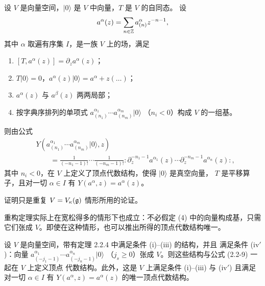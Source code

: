 \renewcommand{\thetheorem}{2.2.4}
\begin{theorem}[弱重构]
    设 $V$ 是向量空间，$|0\rangle$ 是 $V$ 中向量，$T$ 是 $V$ 的自同态。
    设
    \[
        a^\alpha(z)=\sum_{n\in\mathbb{Z}}a^\alpha_{(n)}z^{-n-1},
    \]
    其中 $\alpha$ 取遍有序集 $I$，是一族 $V$ 上的场，满足
    \begin{enumerate}[label=(\arabic*)]
        \item $[T,a^\alpha(z)]=\partial_za^\alpha(z)$；
        \item $T|0\rangle=0$，$a^\alpha(z)|0\rangle=a^\alpha+z(\dots)$；
        \item $a^\alpha(z)$ 与 $a^\beta(z)$ 两两局部；
        \item 按字典序排列的单项式
        $a^{\alpha_1}_{(n_1)}\cdots a^{\alpha_m}_{(n_m)}|0\rangle$
        （$n_i<0$）构成 $V$ 的一组基。
    \end{enumerate}
    则由公式
    \begin{equation}
        \begin{aligned}
            &Y(a^{\alpha_1}_{(n_1)}\cdots a^{\alpha_m}_{(n_m)}|0\rangle,z)\\
            &\qquad=\frac{1}{(-n_1-1)!}\cdots\frac{1}{(-n_m-1)!}
            :\!\partial_z^{-n_1-1}a^{\alpha_1}(z)\cdots
            \partial_z^{-n_m-1}a^{\alpha_n}(z)\!:,
        \end{aligned}
        \tag{2.2-9}
    \end{equation}
    其中 $n_i<0$，在 $V$ 上定义了顶点代数结构，使得 $|0\rangle$ 是真空向量，
    $T$ 是平移算子，且对一切 $\alpha\in I$ 有 $Y(a^\alpha,z)=a^\alpha(z)$。
\end{theorem}

证明只是重复 $V=V_\kappa(\mathfrak{g})$ 情形所用的论证。

重构定理实际上在宽松得多的情形下也成立：不必假定 (4) 中的向量构成基，只需
它们张成 $V$。即使在这种情形，也可以推出所得的顶点代数结构唯一。

\renewcommand{\thetheorem}{2.2.5}
\begin{theorem}[强重构]
    设 $V$ 是向量空间，带有定理 2.2.4 中满足条件 (i)--(iii) 的结构，并且
    满足条件 (iv$'$)：向量
    $a^{\alpha_1}_{(-j_1-1)}\cdots a^{\alpha_n}_{(-j_n-1)}|0\rangle$
    （$j_s\ge 0$）张成 $V$。则这些结构与公式 (2.2-9) 一起在 $V$ 上定义顶点
    代数结构。此外，这是 $V$ 上满足条件 (i)--(iii) 与 (iv$'$) 且满足对一切
    $\alpha\in I$ 有 $Y(a^\alpha,z)=a^\alpha(z)$ 的唯一顶点代数结构。
\end{theorem}

